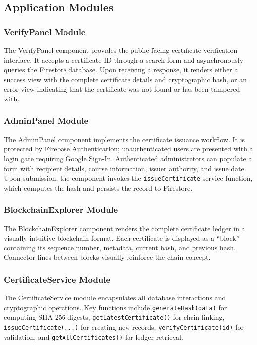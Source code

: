 \documentclass[10pt,twocolumn,a4paper]{article}
\begin{document}
\subsection{Application Modules}

\subsubsection{VerifyPanel Module}

The VerifyPanel component provides the public-facing certificate verification interface. It accepts a certificate ID through a search form and asynchronously queries the Firestore database. Upon receiving a response, it renders either a success view with the complete certificate details and cryptographic hash, or an error view indicating that the certificate was not found or has been tampered with.

\subsubsection{AdminPanel Module}

The AdminPanel component implements the certificate issuance workflow. It is protected by Firebase Authentication; unauthenticated users are presented with a login gate requiring Google Sign-In. Authenticated administrators can populate a form with recipient details, course information, issuer authority, and issue date. Upon submission, the component invokes the \texttt{issueCertificate} service function, which computes the hash and persists the record to Firestore.

\subsubsection{BlockchainExplorer Module}

The BlockchainExplorer component renders the complete certificate ledger in a visually intuitive blockchain format. Each certificate is displayed as a ``block'' containing its sequence number, metadata, current hash, and previous hash. Connector lines between blocks visually reinforce the chain concept.

\subsubsection{CertificateService Module}

The CertificateService module encapsulates all database interactions and cryptographic operations. Key functions include \texttt{generateHash(data)} for computing SHA-256 digests, \texttt{getLatestCertificate()} for chain linking, \texttt{issueCertificate(...)} for creating new records, \texttt{verifyCertificate(id)} for validation, and \texttt{getAllCertificates()} for ledger retrieval.
\end{document}
